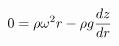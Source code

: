 \documentclass[preview]{standalone}
\begin{document}
\begin{align*}
\special{dvisvgm:raw <g id='unique000'>}0 = \rho \omega^2r - \rho g \frac{dz}{dr}\special{dvisvgm:raw </g>}
\end{align*}
\end{document}
